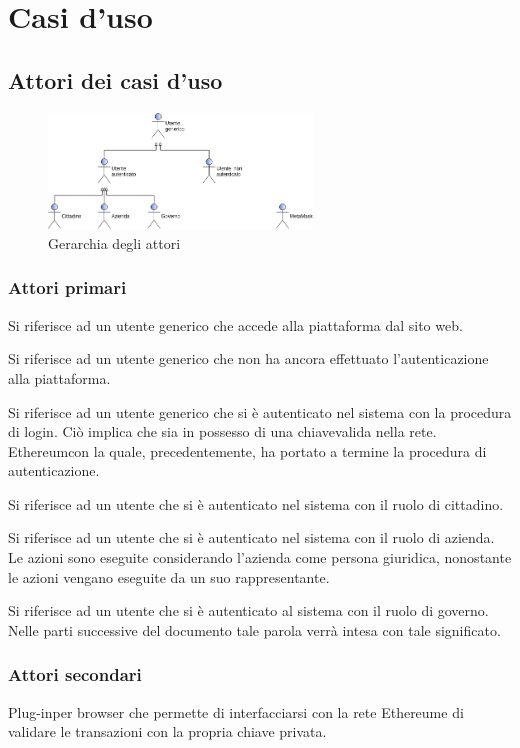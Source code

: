 \section{Casi d'uso} 
\subsection{Attori dei casi d'uso}
\begin{figure}[h]
	\includegraphics[width=7cm]{res/images/attori_primari.png}
	\centering
	\caption{Gerarchia degli attori}
\end{figure}
\subsubsection{Attori primari}
\begin{description}[style=nextline]
	\item[Utente generico]
	Si riferisce ad un utente generico che accede alla piattaforma dal sito web.
	\item[Utente non autenticato]
	Si riferisce ad un utente generico che non ha ancora effettuato 
l'autenticazione alla piattaforma.
	\item[Utente autenticato]
	Si riferisce ad un utente generico che si è autenticato nel sistema con la 
procedura di login. Ciò implica che sia in possesso di una chiave\glosp valida 
nella rete. Ethereum\glosp con la quale, precedentemente, ha portato a termine 
la procedura di autenticazione.
	\item[Cittadino] Si riferisce ad un utente che si è autenticato nel sistema con 
il ruolo di cittadino.
	\item[Azienda] Si riferisce ad un utente che si è autenticato nel sistema con 
il ruolo di azienda. Le azioni sono eseguite considerando l'azienda come persona 
giuridica, nonostante le azioni vengano eseguite da un suo rappresentante.
	\item[Governo\glosp] Si riferisce ad un utente che si è autenticato al sistema 
con il ruolo di governo\glo. Nelle parti successive del documento tale parola 
verrà intesa con tale significato.
\end{description}
\subsubsection{Attori secondari}
\begin{description}[style=nextline]
	\item[MetaMask]
	Plug-in\glosp per browser che permette di interfacciarsi con la rete 
Ethereum\glosp e di validare le transazioni con la propria chiave privata.
	
\end{description}

